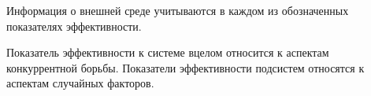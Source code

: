 
Информация о внешней среде учитываются в каждом из обозначенных показателях эффективности.

Показатель эффективности к системе вцелом относится к аспектам конкуррентной борьбы. Показатели эффективности подсистем относятся к аспектам случайных факторов.